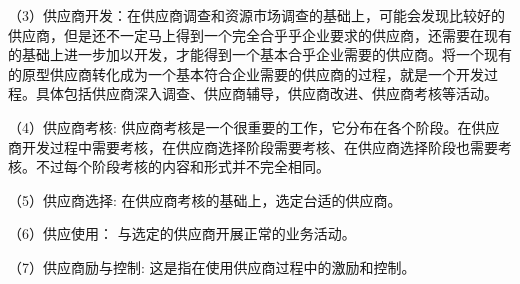     （3）供应商开发：在供应商调查和资源市场调查的基础上，可能会发现比较好的供应商，但是还不一定马上得到一个完全合乎乎企业要求的供应商，还需要在现有的基础上进一步加以开发，才能得到一个基本合乎企业需要的供应商。将一个现有的原型供应商转化成为一个基本符合企业需要的供应商的过程，就是一个开发过程。具体包括供应商深入调查、供应商辅导，供应商改进、供应商考核等活动。

    （4）供应商考核: 供应商考核是一个很重要的工作，它分布在各个阶段。在供应商开发过程中需要考核，在供应商选择阶段需要考核、在供应商选择阶段也需要考核。不过每个阶段考核的内容和形式并不完全相同。

    （5）供应商选择: 在供应商考核的基础上，选定台适的供应商。

    （6）供应使用： 与选定的供应商开展正常的业务活动。

    （7）供应商励与控制: 这是指在使用供应商过程中的激励和控制。
